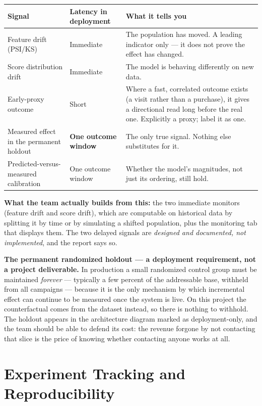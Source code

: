 \documentclass[11pt,a4paper]{article}
\begin{document}
\begin{tabularx}{\textwidth}{@{}L{3.8cm}L{2.4cm}X@{}}
\toprule
\textbf{Signal} & \textbf{Latency in deployment} & \textbf{What it tells you} \\
\midrule
Feature drift (PSI/KS) & Immediate & The population has moved. A leading indicator only --- it does
not prove the effect has changed. \\
Score distribution drift & Immediate & The model is behaving differently on new data. \\
Early-proxy outcome & Short & Where a fast, correlated outcome exists (a visit rather than a
purchase), it gives a directional read long before the real one. Explicitly a proxy; label it as one. \\
Measured effect in the permanent holdout & \textbf{One outcome window} & The only true signal.
Nothing else substitutes for it. \\
Predicted-versus-measured calibration & One outcome window & Whether the model's magnitudes, not
just its ordering, still hold. \\
\bottomrule
\end{tabularx}

\begin{keybox}
\textbf{What the team actually builds from this:} the two immediate monitors (feature drift and
score drift), which are computable on historical data by splitting it by time or by simulating a
shifted population, plus the monitoring tab that displays them. The two delayed signals are
\emph{designed and documented, not implemented}, and the report says so.
\end{keybox}

\begin{keybox}
\textbf{The permanent randomized holdout --- a deployment requirement, not a project deliverable.}
In production a small randomized control group must be maintained \emph{forever} --- typically a few
percent of the addressable base, withheld from all campaigns --- because it is the only mechanism by
which incremental effect can continue to be measured once the system is live. On this project the
counterfactual comes from the dataset instead, so there is nothing to withhold. The holdout appears
in the architecture diagram marked as deployment-only, and the team should be able to defend its
cost: the revenue forgone by not contacting that slice is the price of knowing whether contacting
anyone works at all.
\end{keybox}

\section{Experiment Tracking and Reproducibility}
\end{document}
